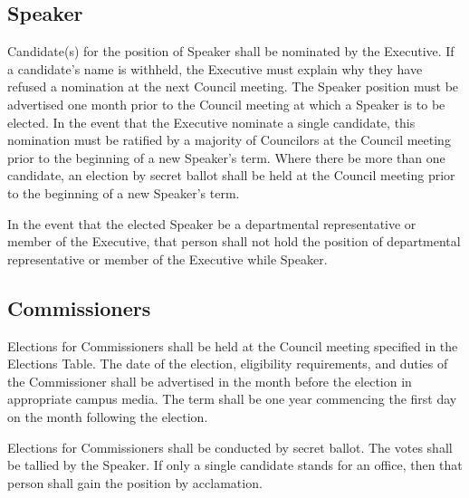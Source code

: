 \subsection{Speaker}
\begin{longenum}[ label*=\thesubsection.\arabic*., align=left]
	\item Candidate(s) for the position of Speaker shall be nominated by the Executive.    If a candidate's name is withheld, the Executive must explain why they have refused a nomination at the next Council meeting. The Speaker position must be advertised one month prior to the Council meeting at which a Speaker is to be elected.   In the event that the Executive nominate a single candidate, this nomination must be ratified by a majority of Councilors at the Council meeting prior to the beginning of a new Speaker's term. Where there be more than one candidate, an election by secret ballot shall be held at the Council meeting prior to the beginning of a new Speaker's term.

	\item In the event that the elected Speaker be a departmental representative or member of the Executive, that person shall not hold the position of departmental representative or member of the Executive while Speaker.
\end{longenum}

\subsection{Commissioners}
\begin{longenum}[ label*=\thesubsection.\arabic*., align=left]
\item Elections for Commissioners shall be held at the Council meeting specified in the Elections Table. The date of the election, eligibility requirements, and duties of the Commissioner shall be advertised in the month before the election in appropriate campus media. The term shall be one year commencing the first day on the month following the election.
 
\item Elections for Commissioners shall be conducted by secret ballot. The votes shall be tallied by the Speaker. If only a single candidate stands for an office, then that person shall gain the position by acclamation.
 
\end{longenum}
\newpage

